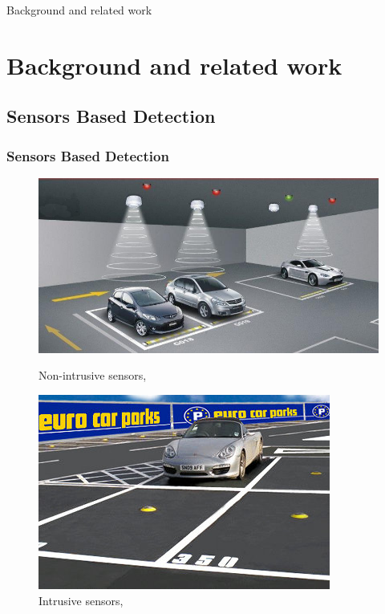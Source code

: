 \documentclass{beamer}
\begin{document}
\begin{frame}
\Huge Background and related work
\end{frame}
\section{Background and related work}

\subsection{Sensors Based Detection}

\begin{frame}
\frametitle{Sensors Based Detection}

\begin{figure}[!htbp]
  \centering
  \begin{minipage}[b]{0.5\textwidth}
    \includegraphics[width=\textwidth]{Pictures/overhead}
    \caption{Non-intrusive sensors, \cite{overhead}}
    \label{nonintru}
  \end{minipage}
  \hfill
  \begin{minipage}[b]{0.4\textwidth}
    \includegraphics[width=\textwidth]{Pictures/sensor}
    \caption{Intrusive sensors, \cite{ground}}
    \label{intru}
  \end{minipage}
\end{figure}

\end{frame}
\end{document}
